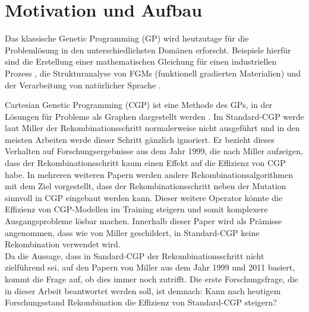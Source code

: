 \chapter{Motivation und Aufbau}
\label{Motivation und Aufbau}

Das klassische Genetic Programming (GP) wird heutzutage für die Problemlösung in den unterschiedlichsten Domänen erforscht.
Beispiele hierfür sind die Erstellung einer mathematischen Gleichung für einen industriellen Prozess \cite{sette_genetic_2001}, die Strukturanalyse von FGMs (funktionell gradierten Materialien) \cite{demirbas_stress_2022} und der Verarbeitung von natürlicher Sprache \cite{araujo_genetic_2020}.

Cartesian Genetic Programming (CGP) ist eine Methode des GPs, in der Lösungen für Probleme als Graphen dargestellt werden \cite{miller_cartesian_2020}. 
Im Standard-CGP werde laut Miller der Rekombinationsschritt normalerweise nicht ausgeführt und in den meisten Arbeiten werde dieser Schritt gänzlich ignoriert. 
Er bezieht dieses Verhalten auf Forschungsergebnisse aus dem Jahr 1999, die nach Miller aufzeigen, dass der Rekombinationsschritt kaum einen Effekt auf die Effizienz von CGP habe. \cite{miller_cartesian_2020} 
In mehreren weiteren Papern werden andere Rekombinationsalgorithmen mit dem Ziel vorgestellt, dass der Rekombinationsschritt neben der Mutation sinnvoll in CGP eingebaut werden kann. 
Dieser weitere Operator könnte die Effizienz von CGP-Modellen im Training steigern und somit komplexere Ausgangsprobleme lösbar machen.
Innerhalb dieser Paper wird als Prämisse angenommen, dass wie von Miller geschildert, in Standard-CGP keine Rekombination verwendet wird. \cite{clegg_new_2007,kalkreuth_comprehensive_2020, torabi_using_2022}\\
Da die Aussage, dass in Sandard-CGP der Rekombinationsschritt nicht zielführend sei, auf den Papern von Miller aus dem Jahr 1999 und 2011 basiert, kommt die Frage auf, ob dies immer noch zutrifft.
Die erste Forschungsfrage, die in dieser Arbeit beantwortet werden soll, ist demnach: \glqq Kann nach heutigem Forschungsstand Rekombination die Effizienz von Standard-CGP steigern?\grqq

